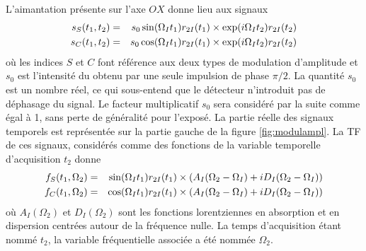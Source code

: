 L'aimantation présente sur l'axe $OX$ donne lieu aux signaux
\begin{eqnarray}
s_S(t_1, t_2) & = & s_0 \sin(\Omega_I t_1) r_{2I}(t_1) \times \exp(i \Omega_I t_2 ) r_{2I}(t_2) \\
s_C(t_1, t_2) & = & s_0 \cos(\Omega_I t_1) r_{2I}(t_1) \times \exp(i \Omega_I t_2 ) r_{2I}(t_2)
\end{eqnarray}
où les indices $S$ et $C$ font référence aux deux types de modulation d'amplitude et $s_0$
est l'intensité du {\FID} obtenu par une seule impulsion de phase $\pi/2$.
La quantité $s_0$ est un nombre réel, ce qui sous-entend que le détecteur n'introduit pas
de déphasage du signal. Le facteur multiplicatif $s_0$ sera considéré par la suite 
comme égal à 1, sans perte de généralité pour l'exposé.
La partie réelle des signaux temporels est représentée sur la partie gauche
de la figure \ref{fig:modulampl}.
La TF de ces signaux, considérés comme des fonctions de la variable 
temporelle d'acquisition $t_2$ donne
\begin{eqnarray}
f_S(t_1, \Omega_2) & = & \sin(\Omega_I t_1) r_{2I}(t_1)
\times (A_I(\Omega_2-\Omega_I) + iD_I(\Omega_2-\Omega_I)) \\
f_C(t_1, \Omega_2) & = & \cos(\Omega_I t_1) r_{2I}(t_1)
\times (A_I(\Omega_2-\Omega_I) + iD_I(\Omega_2-\Omega_I))
\end{eqnarray}
où $A_I(\Omega_2)$ et $D_I(\Omega_2)$ sont les fonctions lorentziennes en absorption
et en dispersion centrées autour de la fréquence nulle.
La temps d'acquisition étant nommé $t_2$, la variable fréquentielle
associée a été nommée $\Omega_2$.
